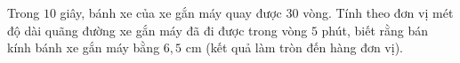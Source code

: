 \begin{ex}
Trong $10$ giây, bánh xe của xe gắn máy quay được $30$ vòng. Tính theo đơn vị mét độ dài quãng đường xe gắn máy đã đi được trong vòng $5$ phút, biết rằng bán kính bánh xe gắn máy bằng $6{,}5$ cm (kết quả làm tròn đến hàng đơn vị).
\end{ex}
